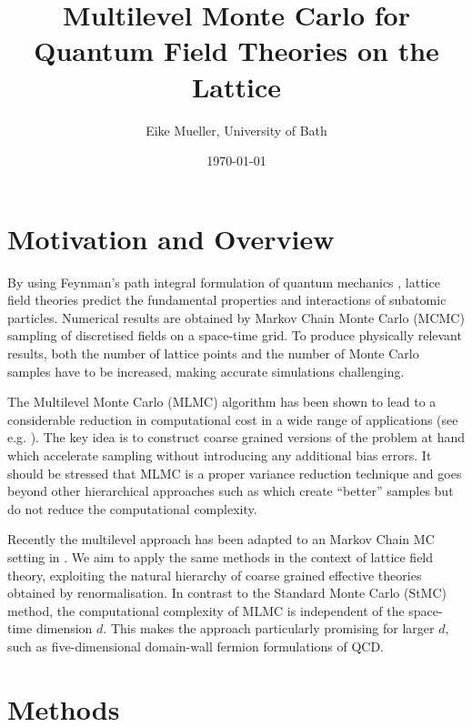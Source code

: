 \documentclass[11pt]{article}
\author{Eike Mueller, University of Bath}
\date{\today}
\title{Multilevel Monte Carlo for Quantum Field Theories on the Lattice}
\begin{document}
\maketitle
\section{Motivation and Overview}
By using Feynman's path integral formulation of quantum mechanics \cite{Feynman2010}, lattice field theories predict the fundamental properties and interactions of subatomic particles. Numerical results are obtained by Markov Chain Monte Carlo (MCMC) sampling of discretised fields on a space-time grid. To produce physically relevant results, both the number of lattice points and the number of Monte Carlo samples have to be increased, making accurate simulations challenging.

The Multilevel Monte Carlo (MLMC) algorithm \cite{Heinrich2001,Giles2008,Giles2015} has been shown to lead to a considerable reduction in computational cost in a wide range of applications (see e.g. \cite{Muller2015,Katsiolides2017}). The key idea is to construct coarse grained versions of the problem at hand which accelerate sampling without introducing any additional bias errors. It should be stressed that MLMC is a proper variance reduction technique and goes beyond other hierarchical approaches such as \cite{Faas1986} which create ``better'' samples but do not reduce the computational complexity.

Recently the multilevel approach has been adapted to an Markov Chain MC setting in \cite{Dodwell2015}. We aim to apply the same methods in the context of lattice field theory, exploiting the natural hierarchy of coarse grained effective theories obtained by renormalisation. In contrast to the Standard Monte Carlo (StMC) method, the computational complexity of MLMC is independent of the space-time dimension $d$. This makes the approach particularly promising for larger $d$, such as five-dimensional domain-wall fermion formulations \cite{Kaplan1992} of QCD. 
\section{Methods}
\end{document}
